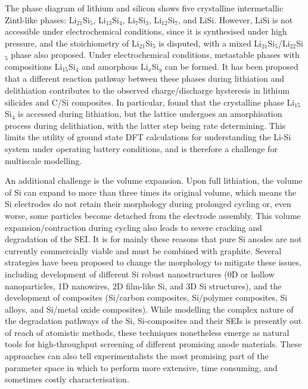 \documentclass[../main.tex]{subfiles}
\begin{document}
The phase diagram of lithium and silicon shows five crystalline intermetallic Zintl-like phases: Li$_{21}$Si$_{5}$, Li$_{13}$Si$_{4}$, Li$_{7}$Si$_{3}$, Li$_{12}$Si$_{7}$, and LiSi.\cite{Okamoto1990} However, LiSi is not accessible under electrochemical conditions, since it is synthesised under high pressure, and the stoichiometry of Li$_{21}$Si$_{5}$ is disputed, with a mixed Li$_{21}$Si$_{5}$/Li$_{22}$Si$_5$ phase also proposed.\cite{gruber2013} Under electrochemical conditions, metastable phases with compositions Li$_{15}$Si$_{4}$\cite{Jiang_2020} and amorphous Li$_x$Si$_y$ can be formed.\cite{Kuhn2011} It has been proposed that a different reaction pathway between these phases during lithiation and delithiation contributes to the observed charge/discharge hysteresis in lithium silicides and C/Si composites.\cite{Jiang_2020} In particular, \citeauthor{Jiang_2020} found that the crystalline phase Li$_{15}$Si$_{4}$ is accessed during lithiation, but the lattice undergoes an amorphisation process during delithiation, with the latter step being rate determining.\cite{Jiang_2020} This limits the utility of ground state DFT calculations for understanding the Li-Si system under operating battery conditions, and is therefore a challenge for multiscale modelling. 

An additional challenge is the volume expansion. Upon full lithiation, the volume of Si can expand to more than three times its original volume, which means the Si electrodes do not retain their morphology during prolonged cycling or, even worse, some particles become detached from the electrode assembly.\cite{Wang-JPS-2014,Wagner-JPS-2019,feng-Small-2018} This volume expansion/contraction during cycling also leads to severe cracking and degradation of the SEI. It is for mainly these reasons that pure Si anodes are not currently commercially viable and must be combined with graphite. Several strategies have been proposed to change the morphology to mitigate these issues, including development of different Si robust nanostructures (0D or hollow nanoparticles, 1D nanowires, 2D film-like Si, and 3D Si structures), \cite{feng-Small-2018} and the development of composites (Si/carbon composites, Si/polymer composites, Si alloys, and Si/metal oxide composites).\cite{asenbauer_success_2020} While modelling the complex nature of the degradation pathways of the Si, Si-composites and their SEIs is presently out of reach of atomistic methods, these techniques nonetheless emerge as natural tools for high-throughput screening of different promising anode materials.\cite{kirklin2013} These approaches can also tell experimentalists the most promising part of the parameter space in which to perform more extensive, time consuming, and sometimes costly characterisation.
\end{document}

